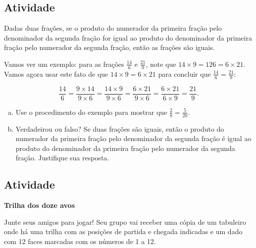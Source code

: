 \subsection{Atividade}

Dadas duas frações, se o produto do numerador da primeira fração pelo denominador da segunda fração for igual ao produto do denominador da primeira fração pelo numerador da segunda fração, então as frações são iguais.

Vamos ver um exemplo: para as frações $\frac{14}{6}$ e $\frac{21}{9}$, note que  $14 \times 9 = 126 = 6 \times 21$. Vamos agora usar este fato de que $14 \times 9 = 6 \times 21$
para concluir que $\frac{14}{6} = \frac{21}{9}$:

$$\frac{14}{6} = \frac{9 \times 14}{9 \times 6} = \frac{14 \times 9}{9 \times 6} = \frac{6 \times 21}{9 \times 6} = \frac{6 \times 21}{6 \times 9} = \frac{21}{9}.$$

\begin{enumerate}[a)]
 \item Use o procedimento do exemplo para mostrar que $\frac{2}{8} = \frac{5}{20}$.
 \item Verdadeirou ou falso? Se duas frações são iguais, então o produto do numerador da primeira fração pelo denominador da segunda fração é igual ao produto do denominador da primeira fração pelo numerador da segunda fração. Justifique sua resposta.
\end{enumerate}

\subsection{Atividade}

{\bf Trilha dos doze avos}

Junte seus amigos para jogar! Seu grupo vai receber uma cópia de um tabuleiro onde há uma trilha com as posições de partida e chegada indicadas e um dado com 12 faces marcadas com os números de 1 a 12.

